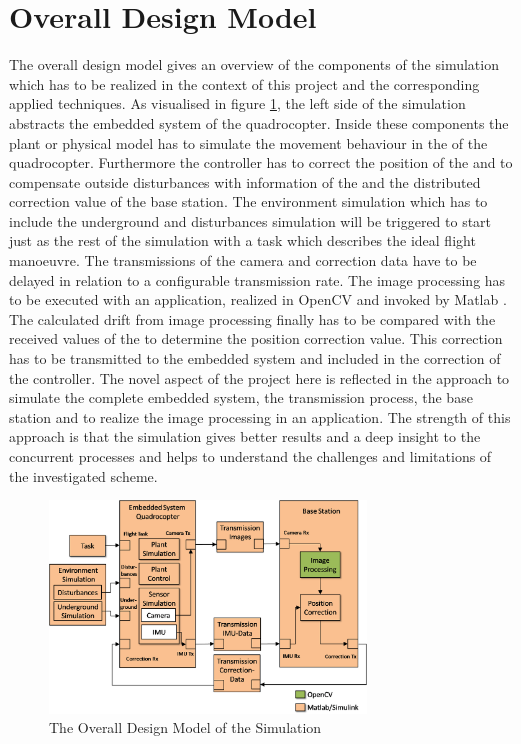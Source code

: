 \section{Overall Design Model}
The overall design model gives an overview of the components of the simulation
which has to be realized in the context of this project and the corresponding
applied techniques. As visualised in figure \ref{fig:InitialDesign}, the left
side of the simulation abstracts the embedded system of the quadrocopter. Inside
these components the plant or physical model has to simulate the movement
behaviour in the \DOF of the quadrocopter. Furthermore the controller has to
correct the position of the \UAV and to compensate outside disturbances with
information of the \IMU and the distributed correction value of the base station.
The environment simulation which has to include the underground and disturbances
simulation will be triggered to start just as the rest of the simulation with a
task which describes the ideal flight manoeuvre. The transmissions of the camera
\IMU and correction data have to be delayed in relation to a configurable
transmission rate. The image processing has to be executed with an application,
realized in OpenCV  and invoked by Matlab
. The calculated drift from
image processing finally has to be compared with the received values of the \IMU
to determine the position correction value. This correction has to be
transmitted to the embedded system and included in the correction of the controller.
\newpage
 The novel aspect of the project here is reflected in the approach to simulate
 the complete embedded system, the transmission process, the base station and to realize the
image processing in an application. The strength of this approach is that the
simulation gives better results and a deep insight to the concurrent processes
and helps to understand the challenges and limitations of the investigated
scheme.


\begin{figure}[!htbp]
	\centering
		\includegraphics[width=0.75\textwidth]{graphic/InitialDesign.png}
\caption
{The Overall Design Model of the Simulation}
	\label{fig:InitialDesign}
\end{figure}

